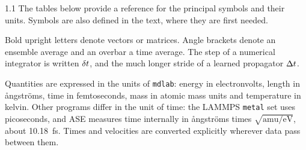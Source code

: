
\thispagestyle{plain}
\begin{spacing}{1.1}
The tables below provide a reference for the principal symbols and their
units. Symbols are also defined in the text, where they are first needed.

Bold upright letters denote vectors or matrices. Angle brackets denote an
ensemble average and an overbar a time average. The step of a numerical
integrator is written $\delta t$, and the much longer stride of a learned
propagator $\Delta t$.

Quantities are expressed in the units of \texttt{mdlab}: energy in
electronvolts, length in \aa ngstr\"oms, time in femtoseconds, mass in
atomic mass units and temperature in kelvin. Other programs differ in the
unit of time: the LAMMPS \texttt{metal} set uses picoseconds, and ASE
measures time internally in \aa ngstr\"oms times $\sqrt{\mathrm{amu}/\mathrm{eV}}$,
about \SI{10.18}{\femto\second}. Times and velocities are converted
explicitly wherever data pass between them.
\end{spacing}
\vspace{6pt}

